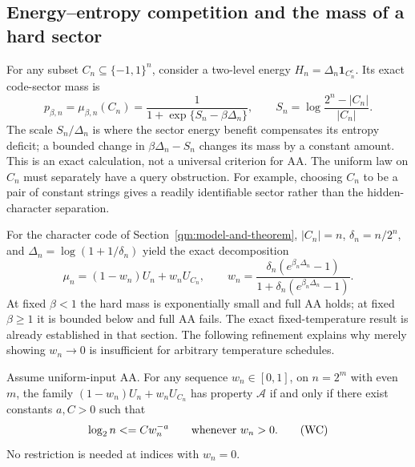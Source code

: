 \subsection{Energy--entropy competition and the mass of a hard sector}
\label{threshold:energy-entropy}

For any subset $C_n\subseteq\{-1,1\}^n$, consider a two-level energy
$H_n=\Delta_n\mathbf1_{C_n^c}$.  Its exact code-sector mass is
\[
 p_{\beta,n}=\mu_{\beta,n}(C_n)
 =\frac1{1+\exp\{S_n-\beta\Delta_n\}},
 \qquad
 S_n=\log\frac{2^n-|C_n|}{|C_n|}.
 \tag{EE}
\]
The scale $S_n/\Delta_n$ is where the sector energy benefit compensates
its entropy deficit; a bounded change in $\beta\Delta_n-S_n$ changes
its mass by a constant amount.  This is an exact calculation, not a
universal criterion for AA.  The uniform law on $C_n$ must separately
have a query obstruction.  For example, choosing $C_n$ to be a pair of
constant strings gives a readily identifiable sector rather than the
hidden-character separation.

For the character code of Section~\ref{qm:model-and-theorem},
$|C_n|=n$, $\delta_n=n/2^n$, and
$\Delta_n=\log(1+1/\delta_n)$ yield the exact decomposition
\[
 \mu_n=(1-w_n)U_n+w_nU_{C_n},\qquad
 w_n=\frac{\delta_n(e^{\beta_n\Delta_n}-1)}
 {1+\delta_n(e^{\beta_n\Delta_n}-1)}.
 \tag{EW}
\]
At fixed $\beta<1$ the hard mass is exponentially small and full AA
holds; at fixed $\beta\ge1$ it is bounded below and full AA fails.
The exact fixed-temperature result is already established in that
section.  The following refinement explains why merely showing
$w_n\to0$ is insufficient for arbitrary temperature schedules.

\begin{theorem}
\label{threshold:weight-criterion}
Assume uniform-input AA.  For any sequence $w_n\in[0,1]$, on
$n=2^m$ with even $m$, the family
$(1-w_n)U_n+w_nU_{C_n}$ has property $\mathcal A$ if and only if there
exist constants $a,C>0$ such that
\[
 \log_2 n\le Cw_n^{-a}\qquad\hbox{whenever }w_n>0.
 \tag{WC}
\]
No restriction is needed at indices with $w_n=0$.
\end{theorem}


